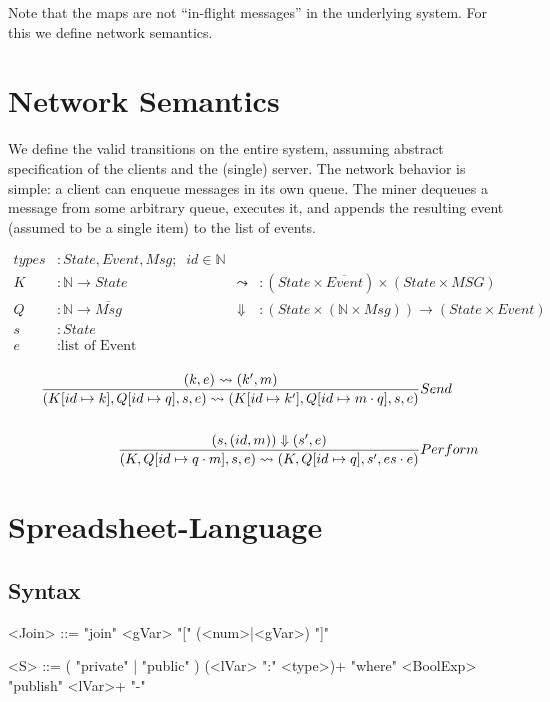 \documentclass[acmsmall,review,anonymous]{acmart}\settopmatter{printfolios=true}
\begin{document}
Note that the maps are not ``in-flight messages'' in the underlying system. For this we define network semantics.

\section{Network Semantics}

We define the valid transitions on the entire system, assuming abstract specification of the clients and the (single) server. The network behavior is simple: a client can enqueue messages in its own queue. The miner dequeues a message from some arbitrary queue, executes it, and appends the resulting event (assumed to be a single item) to the list of events.

\begin{align*}
types &: State, Event, Msg; \;\; id \in \mathbb{N} \\
K &: \mathbb{N} \rightarrow State \; & \leadsto &: (State \times \overline{Event}) \times (State \times MSG) \\
Q &: \mathbb{N} \rightarrow \overline{Msg} \; & \Downarrow &: (State \times (\mathbb{N} \times Msg)) \rightarrow (State \times Event) \\
s &: State \\
e &: \text{list of Event} \\
\end{align*}

\begin{align*}
\judge{&Send}{
	(k, e) \leadsto (k', m)
}{
	(K[id \mapsto k], Q[id \mapsto q], s, e) \leadsto (K[id \mapsto k'], Q[id \mapsto m \cdot q], s, e)
}
\\
\\
\judge{&Perform}{
    (s, (id, m)) \Downarrow (s', e)
}{
	(K, Q[id \mapsto q \cdot m], s, e) \leadsto (K, Q[id \mapsto q], s', es \cdot e)
}
\end{align*}

\pagebreak

\setlength{\grammarindent }{2cm}

\section{Spreadsheet-Language}

\subsection{Syntax}

\begin{grammar}
	<Join>	::= "join" <gVar> "[" (<num>|<gVar>) "]" %

	<S>		::= ( "private" | "public" ) (<lVar> ":" <type>)+ "where" <BoolExp>  %
			\alt "publish" <lVar>+
			\alt "-"
\end{grammar}
\end{document}
